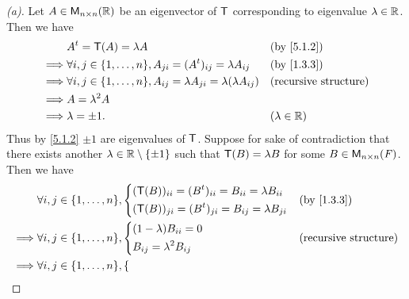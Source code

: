 \begin{proof}[(a)]
  Let \(A \in \ms[n][n][\R]\) be an eigenvector of \(\mathsf{T}\) corresponding to eigenvalue \(\lambda \in \mathbb{R}\).
  Then we have
  \begin{align*}
             & \tp{A} = \T(A) = \lambda A                                                                &  & \by{5.1.2}                   \\
    \implies & \forall i, j \in \set{1, \dots, n}, A_{j i} = (\tp{A})_{i j} = \lambda A_{i j}            &  & \by{1.3.3}                   \\
    \implies & \forall i, j \in \set{1, \dots, n}, A_{i j} = \lambda A_{j i} = \lambda (\lambda A_{i j}) &  & \text{(recursive structure)} \\
    \implies & A = \lambda^2 A                                                                                                             \\
    \implies & \lambda = \pm 1.                                                                          &  & (\lambda \in \R)
  \end{align*}
  Thus by \cref{5.1.2} \(\pm 1\) are eigenvalues of \(\mathsf{T}\).
  Suppose for sake of contradiction that there exists another \(\lambda \in \mathbb{R} \setminus \left\lbrace\pm 1\right\rbrace\) such that \(\mathsf{T}(B) = \lambda B\) for some \(B \in \ms[n][n][\F]\).
  Then we have
  \begin{align*}
             & \forall i, j \in \set{1, \dots, n}, \begin{dcases}
                                                     (\T(B))_{i i} = (\tp{B})_{i i} = B_{i i} = \lambda B_{i i} \\
                                                     (\T(B))_{j i} = (\tp{B})_{j i} = B_{i j} = \lambda B_{j i}
                                                   \end{dcases} &  & \by{1.3.3} \\
    \implies & \forall i, j \in \set{1, \dots, n}, \begin{dcases}
                                                     (1 - \lambda) B_{i i} = 0 \\
                                                     B_{i j} = \lambda^2 B_{i j}
                                                   \end{dcases}            &  & \text{(recursive structure)}  \\
    \implies & \forall i, j \in \set{1, \dots, n}, \begin{dcases}

\end{dcases}
\end{align*}
\end{proof}
